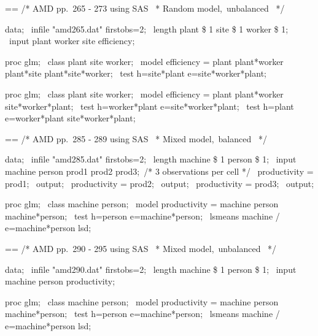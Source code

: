 \documentclass{book}
\makeatletter
\newenvironment{Texinfopreformatted}{%
  \par\GNUTobeylines\obeyspaces\frenchspacing\parskip=\z@\parindent=\z@}{}
{\catcode`\^^M=13 \gdef\GNUTobeylines{\catcode`\^^M=13 \def^^M{\null\par}}}
\newenvironment{Texinfoindented}{\begin{list}{}{}\item\relax}{\end{list}}
\renewcommand{\_}{\Texinfounderscore\discretionary{}{}{}}
\makeatother
\begin{document}
\begin{Texinfoindented}
\begin{Texinfopreformatted}%
\ttfamily 
/* AMD pp.\ 265 - 273 using SAS
\ * Random model,\ unbalanced
\ */

data;
\ infile "amd265.dat" firstobs=2;
\ length plant \$ 1 site \$ 1 worker \$ 1;
\ input plant worker site efficiency;

proc glm;
\ class plant site worker;
\ model efficiency = plant plant*worker plant*site plant*site*worker;
\ test h=site*plant e=site*worker*plant;

proc glm;
\ class plant site worker;
\ model efficiency = plant plant*worker site*worker*plant;
\ test h=worker*plant e=site*worker*plant;
\ test h=plant e=worker*plant site*worker*plant;


\end{Texinfopreformatted}
\end{Texinfoindented}

\begin{Texinfoindented}
\begin{Texinfopreformatted}%
\ttfamily 
/* AMD pp.\ 285 - 289 using SAS
\ * Mixed model,\ balanced
\ */

data;
\ infile "amd285.dat" firstobs=2;
\ length machine \$ 1 person \$ 1;
\ input machine person prod1 prod2 prod3;\ /* 3 observations per cell */
\ productivity = prod1;
\ output;
\ productivity = prod2;
\ output;
\ productivity = prod3;
\ output;

proc glm;
\ class machine person;
\ model productivity = machine person machine*person;
\ test h=person e=machine*person;
\ lsmeans machine / e=machine*person lsd;


\end{Texinfopreformatted}
\end{Texinfoindented}

\begin{Texinfoindented}
\begin{Texinfopreformatted}%
\ttfamily 
/* AMD pp.\ 290 - 295 using SAS
\ * Mixed model,\ unbalanced
\ */

data;
\ infile "amd290.dat" firstobs=2;
\ length machine \$ 1 person \$ 1;
\ input machine person productivity;

proc glm;
\ class machine person;
\ model productivity = machine person machine*person;
\ test h=person e=machine*person;
\ lsmeans machine / e=machine*person lsd;


\end{Texinfopreformatted}
\end{Texinfoindented}
\end{document}
